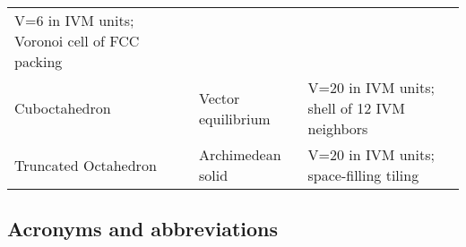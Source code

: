\documentclass[
  10pt,
]{article}
\begin{document}
\begin{longtable}[]{@{}lll@{}}
\begin{minipage}[t]{0.30\columnwidth}
V=6 in IVM units; Voronoi cell of FCC packing\strut
\end{minipage}\tabularnewline
\begin{minipage}[t]{0.30\columnwidth}\raggedright
Cuboctahedron\strut
\end{minipage} & \begin{minipage}[t]{0.30\columnwidth}\raggedright
Vector equilibrium\strut
\end{minipage} & \begin{minipage}[t]{0.30\columnwidth}\raggedright
V=20 in IVM units; shell of 12 IVM neighbors\strut
\end{minipage}\tabularnewline
\begin{minipage}[t]{0.30\columnwidth}\raggedright
Truncated Octahedron\strut
\end{minipage} & \begin{minipage}[t]{0.30\columnwidth}\raggedright
Archimedean solid\strut
\end{minipage} & \begin{minipage}[t]{0.30\columnwidth}\raggedright
V=20 in IVM units; space-filling tiling\strut
\end{minipage}\tabularnewline
\bottomrule
\end{longtable}

\hypertarget{acronyms-and-abbreviations}{%
\subsection{Acronyms and
abbreviations}\label{acronyms-and-abbreviations}}
\end{document}
